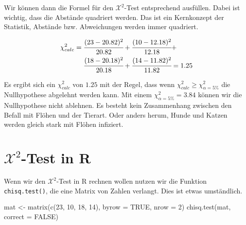 \documentclass[
  letterpaper,
  DIV=11,
  oneside]{scrreport}
\newenvironment{Shaded}{\begin{snugshade}}{\end{snugshade}}
\newcommand{\AttributeTok}[1]{\textcolor[rgb]{0.40,0.45,0.13}{#1}}
\newcommand{\ConstantTok}[1]{\textcolor[rgb]{0.56,0.35,0.01}{#1}}
\newcommand{\DecValTok}[1]{\textcolor[rgb]{0.68,0.00,0.00}{#1}}
\newcommand{\FunctionTok}[1]{\textcolor[rgb]{0.28,0.35,0.67}{#1}}
\newcommand{\NormalTok}[1]{\textcolor[rgb]{0.00,0.23,0.31}{#1}}
\newcommand{\OtherTok}[1]{\textcolor[rgb]{0.00,0.23,0.31}{#1}}
\begin{document}
Wir können dann die Formel für den \(\mathcal{X}^2\)-Test entsprechend
ausfüllen. Dabei ist wichtig, dass die Abstände quadriert werden. Das
ist ein Kernkonzept der Statistik, Abstände bzw. Abweichungen werden
immer quadriert.

\begin{align*} 
\chi^2_{calc} &= \cfrac{(23 - 20.82)^2}{20.82} + \cfrac{(10 - 12.18)^2}{12.18} + \\
&\phantom{=}\;\; \cfrac{(18 - 20.18)^2}{20.18} + \cfrac{(14 - 11.82)^2}{11.82} = 1.25
\end{align*}

Es ergibt sich ein \(\chi^2_{calc}\) von \(1.25\) mit der Regel, dass
wenn \(\chi^2_{calc} \geq \chi^2_{\alpha=5\%}\) die Nullhypothese
abgelehnt werden kann. Mit einem \(\chi^2_{\alpha=5\%} = 3.84\) können
wir die Nullhypothese nicht ablehnen. Es besteht kein Zusammenhang
zwischen den Befall mit Flöhen und der Tierart. Oder anders herum, Hunde
und Katzen werden gleich stark mit Flöhen infiziert.

\hypertarget{mathcalx2-test-in-r}{%
\section{\texorpdfstring{\(\mathcal{X}^2\)-Test in
R}{\textbackslash mathcal\{X\}\^{}2-Test in R}}\label{mathcalx2-test-in-r}}

{}

Wenn wir den \(\mathcal{X}^2\)-Test in R rechnen wollen nutzen wir die
Funktion \texttt{chisq.test()}, die eine Matrix von Zahlen verlangt.
Dies ist etwas umständlich.

\begin{Shaded}
\begin{Highlighting}[]
\NormalTok{mat }\OtherTok{\textless{}{-}} \FunctionTok{matrix}\NormalTok{(}\FunctionTok{c}\NormalTok{(}\DecValTok{23}\NormalTok{, }\DecValTok{10}\NormalTok{, }\DecValTok{18}\NormalTok{, }\DecValTok{14}\NormalTok{), }
              \AttributeTok{byrow =} \ConstantTok{TRUE}\NormalTok{, }\AttributeTok{nrow =} \DecValTok{2}\NormalTok{)}
\FunctionTok{chisq.test}\NormalTok{(mat, }\AttributeTok{correct =} \ConstantTok{FALSE}\NormalTok{)}
\end{Highlighting}
\end{Shaded}
\end{document}
